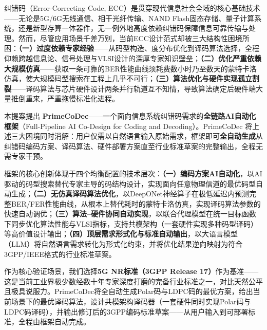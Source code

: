 ﻿\vspace{6pt}
\begin{tcolorbox}[abstractstyle,
  title={执行摘要 \quad {\normalsize\normalfont\itshape (Executive Summary)}}]

纠错码（Error-Correcting Code, ECC）是贯穿现代信息社会全域的核心基础技术——无论是5G/6G无线通信、相干光纤传输、NAND Flash固态存储、量子计算系统，还是新型存算一体器件，无一例外地高度依赖纠错码保障信息可靠传输与处理。然而，尽管应用场景千差万别，当前ECC设计范式却被三大结构性困境所困：\textbf{（一）过度依赖专家经验}——从码型构造、度分布优化到译码算法选择，全程仰赖跨越信息论、信号处理与VLSI设计的深厚专家知识壁垒；\textbf{（二）优化严重依赖大规模仿真}——获取一条可靠的BER性能曲线须耗费数小时乃至数天的蒙特卡洛仿真，使大规模码型搜索在工程上几乎不可行；\textbf{（三）算法优化与硬件实现孤立割裂}——译码算法与芯片硬件设计两条并行轨道互不知情，导致算法确定后硬件端大量推倒重来，严重拖慢标准化进程。

\vspace{4pt}
本提案提出 \textbf{PrimeCoDec}——一个面向信息系统纠错码需求的\textbf{全链路AI自动化框架}（Full-Pipeline AI Co-Design for Coding and Decoding）。PrimeCoDec 将上述三大困境同时消解：用户仅需以自然语言输入原始需求，框架即可\textbf{全自动生成}从纠错码编码方案、译码算法、硬件部署方案直至行业标准草案的完整输出，全程无需专家干预。

\vspace{4pt}
框架的核心创新体现于四个均衡配置的技术层次：\textbf{（一）编码方案AI自动化}，以AI驱动的码型搜索替代专家主导的码结构设计，实现面向任意物理信道的最优码型自动生成；\textbf{（二）无仿真译码算法优化}，以DeepONet神经算子在极低延迟内预测完整BER/FER性能曲线，从根本上替代耗时的蒙特卡洛仿真，实现译码算法参数的快速自动调优；\textbf{（三）算法--硬件协同自动实现}，以联合代理模型在统一目标函数下同步优化算法性能与VLSI指标，支持共模架构（一套硬件实现多种码型译码）等高价值设计输出；\textbf{（四）顶层需求形式化与标准自动输出}，以大语言模型（LLM）将自然语言需求转化为形式化约束，并将优化结果逆向映射为符合3GPP/IEEE格式的行业标准草案。

\vspace{4pt}
作为核心验证场景，我们选择\textbf{5G NR标准（3GPP Release 17）}作为基准——这是当前工业界极少数经数十年专家深度打磨的完备行业标准之一，对比天然公平且极具说服力。PrimeCoDec将全自动生成Polar码与LDPC码的最优方案，给出当前场景下的最优译码算法，设计共模架构译码器（一套硬件同时实现Polar码与LDPC码译码），并输出修订后的3GPP编码标准草案——从用户输入到可部署标准，全程由框架自动完成。
\end{tcolorbox}
\vspace{4pt}